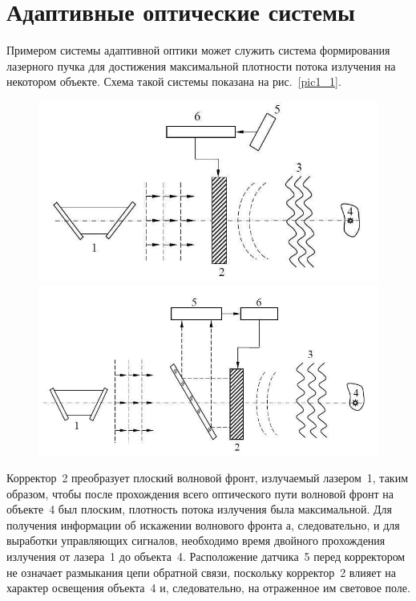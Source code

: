 \documentclass[pscyr,titlepage]{hedreport}
\newcommand{\pic}[1]{\ref{pic#1}}
\begin{document}
\maketitle
\onehalfspacing

\section{Адаптивные оптические системы}

Примером системы адаптивной оптики может служить система формирования лазерного
пучка для достижения максимальной плотности потока излучения на некотором
объекте. Схема такой системы показана на рис.~\pic{1_1}.

\begin{figure}[ht]
  \center
  \includegraphics[width=.47\textwidth]{sl_1_1} \hfill
  \includegraphics[width=.47\textwidth]{sl_1_2} \\
  \parbox{.47\textwidth}{ \caption{} \label{pic1_1} } \hfill
  \parbox{.47\textwidth}{ \caption{} \label{pic1_2} }
\end{figure}

Корректор~2 преобразует плоский волновой фронт, излучаемый лазером~1, таким
образом, чтобы после прохождения всего оптического пути волновой фронт на
объекте~4 был плоским, плотность потока излучения была максимальной. Для
получения информации об искажении волнового фронта а, следовательно, и для
выработки управляющих сигналов, необходимо время двойного прохождения излучения
от лазера~1 до объекта~4. Расположение датчика~5 перед корректором не означает
размыкания цепи обратной связи, поскольку корректор~2 влияет на характер
освещения объекта~4 и, следовательно, на отраженное им световое поле.
\end{document}
